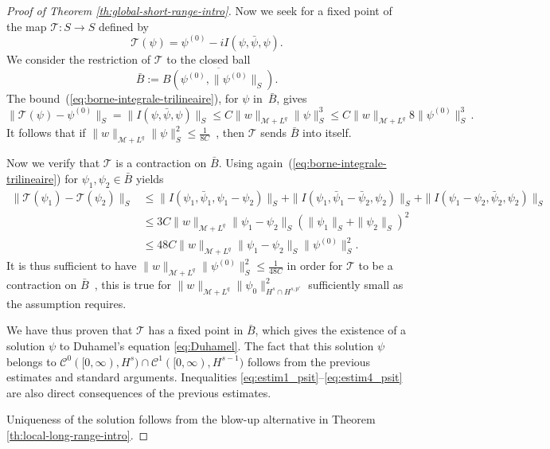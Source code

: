 \documentclass[12pt]{article}
\theoremstyle{plain}
\newcommand{\meas}{\mathcal{M}}
\begin{document}
\begin{proof}[Proof of Theorem \ref{th:global-short-range-intro}]
Now we seek for a fixed point of the map $\mathcal{T}:S\to S$ defined by
\[
\mathcal{T}(\psi)=\psi^{(0)}-iI(\psi,\bar{\psi},\psi).
\]
We consider the restriction of $\mathcal{T}$ to the closed ball
\begin{equation*}
    \bar{B}:=\overline{B(\psi^{(0)},\|\psi^{(0)}\|_{S})}.
\end{equation*}
The bound~(\ref{eq:borne-integrale-trilineaire}), for $\psi$ in~$\bar{B}$, gives
\[
\|\mathcal{T}(\psi)-\psi^{(0)}\|_S=\|I(\psi,\bar{\psi},\psi)\|_{S}\leq C\|w\|_{\meas+L^{q}}\|\psi\|_{S}^{3}\leq C\|w\|_{\meas+L^{q}}8\|\psi^{(0)}\|_{S}^{3}\,.
\]
It follows that if $\|w\|_{\meas+L^{q}}\|\psi\|_{S}^{2}\leq\frac{1}{8C}$~, then  $\mathcal{T}$ sends $\bar{B}$ into itself.

Now we verify that $\mathcal{T}$ is a contraction on $\bar{B}$. Using again~(\ref{eq:borne-integrale-trilineaire}) for $\psi_{1},\psi_{2}\in\bar{B}$ yields
\begin{align*}
\|\mathcal{T}(\psi_{1})-\mathcal{T}(\psi_{2})\|_{S} & \leq\|I(\psi_{1},\bar{\psi}_{1},\psi_{1}-\psi_{2})\|_{S}+\|I(\psi_{1},\bar{\psi}_{1}-\bar{\psi}_{2},\psi_{2})\|_{S}+\|I(\psi_{1}-\psi_{2},\bar{\psi}_{2},\psi_{2})\|_{S}\\
 & \leq3C\|w\|_{\meas+L^{q}}\|\psi_{1}-\psi_{2}\|_{S}(\|\psi_{1}\|_{S}+\|\psi_{2}\|_{S})^{2}\\
 & \leq 48C\|w\|_{\meas+L^{q}}\|\psi_{1}-\psi_{2}\|_{S}\|\psi^{(0)}\|_{S}^{2}.
\end{align*}
It is thus sufficient to have $\|w\|_{\meas+L^{q}}\|\psi^{(0)}\|_{S}^{2}\leq\frac{1}{48C}$
in order for $ \mathcal{T}$ to be a contraction on $\bar{B}$~,
this is true for $\|w\|_{\meas+L^{q}}\|\psi_{0}\|_{H^{s}\cap H^{s,p'}}^{2}$
sufficiently small as the assumption requires.

We have thus proven that $\mathcal{T}$ has a fixed point in $\bar{B}$, which gives the existence of a solution $\psi$ to Duhamel's equation \eqref{eq:Duhamel}. The fact that this solution $\psi$ belongs to $\mathcal{C}^0([0,\infty),H^{s})\cap \mathcal{C}^1([0,\infty),H^{s-1})$ follows from the previous estimates and standard arguments. Inequalities \eqref{eq:estim1_psit}--\eqref{eq:estim4_psit} are also direct consequences of the previous estimates.

Uniqueness of the solution follows from the blow-up alternative in Theorem \ref{th:local-long-range-intro}.
\end{proof}
\end{document}
